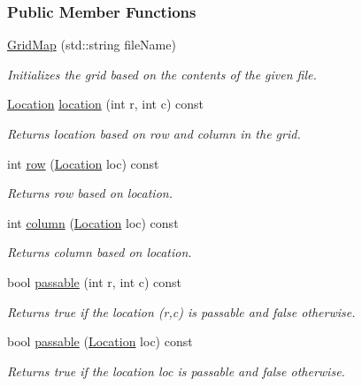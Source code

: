 \subsubsection*{Public Member Functions}
\begin{DoxyCompactItemize}
\item 
\hyperlink{structGridMap_ac70dd252f9ea1b6996ae2145fb4fca7f}{Grid\+Map} (std\+::string file\+Name)
\begin{DoxyCompactList}\small\item\em Initializes the grid based on the contents of the given file. \end{DoxyCompactList}\item 
\hyperlink{structGridMap_ad3b51a1e56e84f0548a80ed647ea359c}{Location} \hyperlink{structGridMap_ae4ee97945ca450cf548848105c404584}{location} (int r, int c) const 
\begin{DoxyCompactList}\small\item\em Returns location based on row and column in the grid. \end{DoxyCompactList}\item 
int \hyperlink{structGridMap_af98136d9731a0a76312b0e1060329003}{row} (\hyperlink{structGridMap_ad3b51a1e56e84f0548a80ed647ea359c}{Location} loc) const 
\begin{DoxyCompactList}\small\item\em Returns row based on location. \end{DoxyCompactList}\item 
int \hyperlink{structGridMap_a2b1edc4d60642b5cc8e212db27302a9d}{column} (\hyperlink{structGridMap_ad3b51a1e56e84f0548a80ed647ea359c}{Location} loc) const 
\begin{DoxyCompactList}\small\item\em Returns column based on location. \end{DoxyCompactList}\item 
bool \hyperlink{structGridMap_aa35fdb5f87adc783b10b9e71fbc41185}{passable} (int r, int c) const 
\begin{DoxyCompactList}\small\item\em Returns {\ttfamily true} if the location {\ttfamily }(r,c) is passable and {\ttfamily false} otherwise. \end{DoxyCompactList}\item 
bool \hyperlink{structGridMap_a6c3d3dece6a41cbc70561cb188d4220b}{passable} (\hyperlink{structGridMap_ad3b51a1e56e84f0548a80ed647ea359c}{Location} loc) const 
\begin{DoxyCompactList}\small\item\em Returns {\ttfamily true} if the location {\ttfamily loc} is passable and {\ttfamily false} otherwise. \end{DoxyCompactList}\item 

\end{DoxyCompactItemize}
